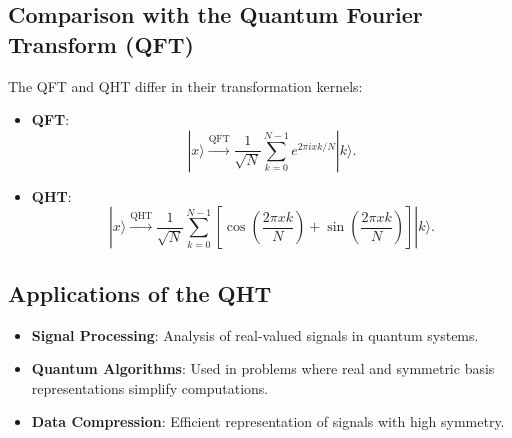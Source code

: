 \documentclass[11pt]{article}
\theoremstyle{definition}
\begin{document}
\subsection*{Comparison with the Quantum Fourier Transform (QFT)}
The QFT and QHT differ in their transformation kernels:
\begin{itemize}
    \item \textbf{QFT}:
    \[
    |x\rangle \xrightarrow{\text{QFT}} \frac{1}{\sqrt{N}} \sum_{k=0}^{N-1} e^{2\pi i x k / N} |k\rangle.
    \]
    \item \textbf{QHT}:
    \[
    |x\rangle \xrightarrow{\text{QHT}} \frac{1}{\sqrt{N}} \sum_{k=0}^{N-1} \left[\cos\left(\frac{2\pi x k}{N}\right) + \sin\left(\frac{2\pi x k}{N}\right)\right] |k\rangle.
    \]
\end{itemize}

\subsection*{Applications of the QHT}
\begin{itemize}
    \item \textbf{Signal Processing}: Analysis of real-valued signals in quantum systems.
    \item \textbf{Quantum Algorithms}: Used in problems where real and symmetric basis representations simplify computations.
    \item \textbf{Data Compression}: Efficient representation of signals with high symmetry.
\end{itemize}




\end{document}
